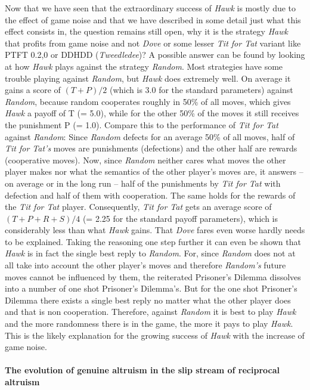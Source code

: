 Now that we have seen that the extraordinary success of {\em Hawk} is mostly
due to the effect of game noise and that we have described in some detail just
what this effect consists in, the question remains still open, why it is the
strategy {\em Hawk} that profits from game noise and not {\em Dove} or some
lesser {\em Tit for Tat} variant like PTFT 0.2,0 or DDHDD ({\em Tweedledee})?
A possible answer can be found by looking at how {\em Hawk} plays against the
strategy {\em Random}.  Most strategies have some trouble playing against {\em
  Random}, but {\em Hawk} does extremely well. On average it gains a score of
$(T+P)/2$ (which is 3.0 for the standard parameters) against {\em Random},
because random cooperates roughly in 50\% of all moves, which gives {\em Hawk}
a payoff of T (= 5.0), while for the other 50\% of the moves it still receives
the punishment P (= 1.0). Compare this to the performance of {\em Tit for Tat}
against {\em Random}: Since {\em Random} defects for an average 50\% of all
moves, half of {\em Tit for Tat's} moves are punishments (defections) and the
other half are rewards (cooperative moves). Now, since {\em Random} neither
cares what moves the other player makes nor what the semantics of the other
player's moves are, it answers -- on average or in the long run -- half of the
punishments by {\em Tit for Tat} with defection and half of them with
cooperation. The same holds for the rewards of the {\em Tit for Tat} player.
Consequently, {\em Tit for Tat} gets an average score of $(T+P+R+S)/4$ (= 2.25
for the standard payoff parameters), which is considerably less than what {\em
  Hawk} gains. That {\em Dove} fares even worse hardly needs to be
explained. Taking the reasoning one step further it can even be shown that
{\em Hawk} is in fact the single best reply to {\em Random}. For, since {\em
  Random} does not at all take into account the other player's moves and
therefore {\em Random's} future moves cannot be influenced by them, the
reiterated Prisoner's Dilemma dissolves into a number of one shot Prisoner's
Dilemma's.  But for the one shot Prisoner's Dilemma there exists a single best
reply no matter what the other player does and that is non cooperation.
Therefore, against {\em Random} it is best to play {\em Hawk} and the more
randomness there is in the game, the more it pays to play {\em Hawk}. This is
the likely explanation for the growing success of {\em Hawk} with the increase
of game noise.

\paragraph{The evolution of genuine altruism in the slip stream of
  reciprocal altruism}
\label{slipstreamAltruism}

